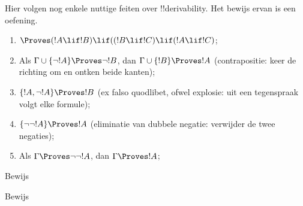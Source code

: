 \documentclass[../../../include/open-logic-section]{subfiles}
\begin{document}
Hier volgen nog enkele nuttige feiten over !!{derivability}. Het
bewijs ervan is een oefening.

\begin{prop}
\begin{enumerate}
\item $\Proves (!A \lif !B) \lif ((!B \lif !C)
  \lif (!A \lif !C)$; 
\item Als $\Gamma \cup \{ \lnot !A\}
  \Proves \lnot !B$, dan $\Gamma \cup \{ !B\} \Proves
  !A$ (contrapositie: keer de richting om en ontken beide kanten);
\item  $\{ !A, \lnot!A\} \Proves
    !B$ (ex falso quodlibet, ofwel explosie: uit een tegenspraak volgt
    elke formule); 
\item  $\{ \lnot\lnot!A\} \Proves
  !A$ (eliminatie van dubbele negatie: verwijder de twee negaties);
\item Als $\Gamma \Proves \lnot\lnot!A$, dan $\Gamma \Proves
  !A$;
\end{enumerate}
\end{prop}

\begin{prob}
  Bewijs 
\end{prob}
\tagendprob

\begin{prob}
  Bewijs 
\end{prob}
\tagendprob
\end{document}
